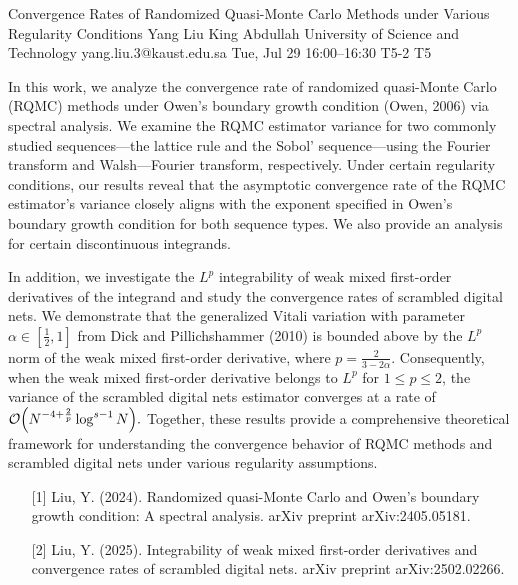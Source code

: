 \begin{talk}
  {Convergence Rates of Randomized Quasi-Monte Carlo Methods under Various Regularity Conditions}%
  {Yang Liu}%
  {King Abdullah University of Science and Technology}%
  {yang.liu.3@kaust.edu.sa}%
  {}%
  {}%
  {Tue, Jul 29 16:00–16:30}%
  {T5-2}%
  {T5}%
  
				
        
        In this work, we analyze the convergence rate of randomized quasi-Monte Carlo (RQMC) methods under Owen's boundary growth condition (Owen, 2006) via spectral analysis. We examine the RQMC estimator variance for two commonly studied sequences—the lattice rule and the Sobol' sequence—using the Fourier transform and Walsh---Fourier transform, respectively. Under certain regularity conditions, our results reveal that the asymptotic convergence rate of the RQMC estimator's variance closely aligns with the exponent specified in Owen's boundary growth condition for both sequence types. We also provide an analysis for certain discontinuous integrands.

        In addition, we investigate the \(L^p\) integrability of weak mixed first-order derivatives of the integrand and study the convergence rates of scrambled digital nets. We demonstrate that the generalized Vitali variation with parameter \(\alpha \in \left[\frac{1}{2}, 1\right]\) from Dick and Pillichshammer (2010) is bounded above by the \(L^p\) norm of the weak mixed first-order derivative, where \(p = \frac{2}{3-2\alpha}\). Consequently, when the weak mixed first-order derivative belongs to \(L^p\) for \(1 \leq p \leq 2\), the variance of the scrambled digital nets estimator converges at a rate of
        \(
        \mathcal{O}\Bigl(N^{-4+\frac{2}{p}} \log^{s-1} N\Bigr).
        \)
        Together, these results provide a comprehensive theoretical framework for understanding the convergence behavior of RQMC methods and scrambled digital nets under various regularity assumptions.
        

\medskip

\begin{enumerate}
	\item[{[1]}] Liu, Y. (2024). Randomized quasi-Monte Carlo and Owen's boundary growth condition: A spectral analysis. arXiv preprint arXiv:2405.05181.
	\item[{[2]}] Liu, Y. (2025). Integrability of weak mixed first-order derivatives and convergence rates of scrambled digital nets. arXiv preprint arXiv:2502.02266.
\end{enumerate}


\end{talk}
